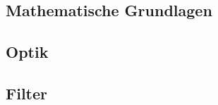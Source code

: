 
\subsection{Mathematische Grundlagen}
\label{chap:math_basic}


\subsection{Optik}


\subsection{Filter}
